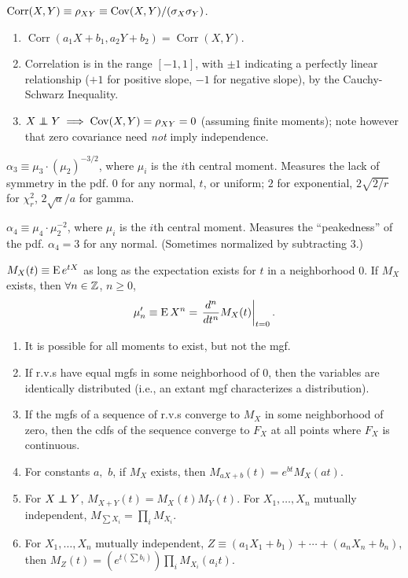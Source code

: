 \documentclass[8pt,letterpaper, landscape]{extarticle} %
\begin{document}
\begin{multicols}{3}
\begin{description}
 $ \operatorname{Corr} (X,Y) \equiv \rho_{XY} \equiv \operatorname{Cov} (X,Y) / (\sigma_X \sigma_Y) $.
\begin{enumerate}
\item $ \operatorname{Corr} (a_1 X + b_1, a_2 Y + b_2) = \operatorname{Corr} (X,Y) $.
\item Correlation is in the range $ [-1,1] $, with $ \pm 1 $ indicating a perfectly linear relationship ($ +1 $ for positive slope, $ -1 $ for negative slope), by the Cauchy-Schwarz Inequality.
\item $ X \independent Y \implies \Cov (X,Y) = \rho_{XY} = 0 $ (assuming finite moments); note however that zero covariance need \textit{not} imply independence.
\end{enumerate}

 $ \alpha_3 \equiv \mu_3 \cdot (\mu_2)^{-3/2} $, where $ \mu_i $ is the $ i $th central moment. Measures the lack of symmetry in the pdf. 0 for any normal, $ t $, or uniform; $ 2 $ for exponential, $ 2 \sqrt{2/r} $ for $ \chi_r^2 $, $ 2 \sqrt{a} / a $  for gamma.

 $ \alpha_4 \equiv \mu_4 \cdot \mu_2^{-2} $, where $ \mu_i $ is the $ i $th central moment. Measures the ``peakedness'' of the pdf. $ \alpha_4 = 3 $ for any normal. (Sometimes normalized by subtracting 3.)

 $ M_X(t) \equiv \operatorname{E} e^{tX} $ as long as the expectation exists for $ t $ in a neighborhood 0. If $ M_X $ exists, then $ \forall n \in \mathbb{Z}$, $ n \geq 0 $,
$$ \mu_{n}' \equiv \operatorname{E} X^n = \left. \frac{d^n}{dt^n} M_X(t) \right|_{t=0}. $$
\begin{enumerate}
\item It is possible for all moments to exist, but not the mgf.
\item If r.v.s have equal mgfs in some neighborhood of 0, then the variables are identically distributed (i.e., an extant mgf characterizes a distribution).
\item If the mgfs of a sequence of r.v.s converge to $ M_X $ in some neighborhood of zero, then the cdfs of the sequence converge to $ F_X $ at all points where $ F_X $ is continuous.
\item For constants $ a, $ $ b $, if $ M_X $ exists, then $ M_{aX + b} (t) = e^{bt} M_X (at) $.
\item For $ X \independent Y $, $ M_{X + Y}(t) = M_X(t) M_Y (t) $. For $ X_1, \dotsc, X_n $ mutually independent, $ M_{\sum X_i} = \prod_i M_{X_i} $.
\item For $ X_1, \dotsc, X_n $ mutually independent, $ Z \equiv (a_1 X_1 + b_1) + \dotsb + (a_n X_n + b_n) $, then $ M_{Z}(t) = (e^{t(\sum b_i)}) \prod_i M_{X_i}(a_i t) $.
\end{enumerate}


\end{description}
\end{multicols}
\end{document}
